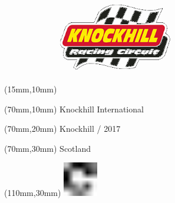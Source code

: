 \null\newpage
\begin{textblock*}{50mm}(15mm,10mm)%
\includegraphics[width=50mm]{LG/KNO.png}
\end{textblock*}
\begin{textblock*}{130mm}(70mm,10mm)%
{\fontsize{20}{20}\selectfont Knockhill International}\\
\end{textblock*}
\begin{textblock*}{120mm}(70mm,20mm)%
{\fontsize{16}{16}\selectfont Knockhill / 2017}\\
\end{textblock*}
\begin{textblock*}{120mm}(70mm,30mm)%
{\fontsize{12}{12}\selectfont Scotland}
\end{textblock*}
\begin{textblock*}{30mm}(110mm,30mm)%
\centering
\includegraphics[height=15mm]{icons/fa-rotate-right.pdf}
\end{textblock*}
